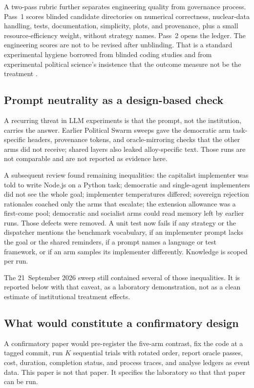 \documentclass[11pt,a4paper]{article}
\begin{document}
A two-pass rubric further separates engineering quality from governance process. Pass~1
scores blinded candidate directories on numerical correctness, nuclear-data handling,
tests, documentation, simplicity, plots, and provenance, plus a small resource-efficiency
weight, without strategy names. Pass~2 opens the ledger. The engineering scores are not
to be revised after unblinding. That is a standard experimental hygiene borrowed from
blinded coding studies and from experimental political science's insistence that the
outcome measure not be the treatment \citep{druckman2011}.

\subsection{Prompt neutrality as a design-based check}

A recurring threat in LLM experiments is that the prompt, not the institution, carries
the answer. Earlier Political Swarm sweeps gave the democratic arm task-specific headers,
provenance tokens, and oracle-mirroring checks that the other arms did not receive;
shared layers also leaked alloy-specific text. Those runs are not comparable and are not
reported as evidence here.

A subsequent review found remaining inequalities: the capitalist implementer was told to
write Node.js on a Python task; democratic and single-agent implementers did not see the
whole goal; implementer temperatures differed; sovereign rejection rationales coached
only the arms that escalate; the extension allowance was a first-come pool; democratic
and socialist arms could read memory left by earlier runs. Those defects were removed.
A unit test now fails if any strategy or the dispatcher mentions the benchmark
vocabulary, if an implementer prompt lacks the goal or the shared reminders, if a prompt
names a language or test framework, or if an arm samples its implementer differently.
Knowledge is scoped per run.

The 21~September 2026 sweep still contained several of those inequalities. It is
reported below with that caveat, as a laboratory demonstration, not as a clean estimate
of institutional treatment effects.

\subsection{What would constitute a confirmatory design}

A confirmatory paper would pre-register the five-arm contrast, fix the code at a tagged
commit, run $K$ sequential trials with rotated order, report oracle passes, cost,
duration, completion status, and process traces, and analyse ledgers as event data. This
paper is not that paper. It specifies the laboratory so that that paper can be run.
\end{document}

